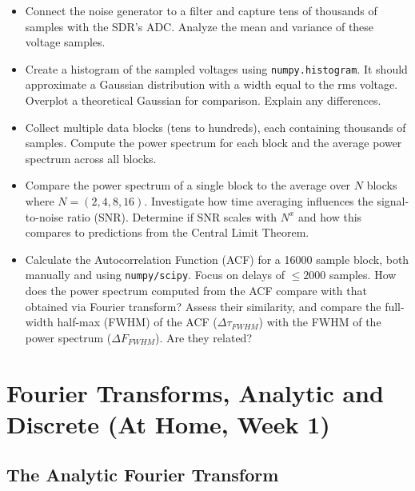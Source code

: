 \documentclass[11pt,preprint]{aastex}
\begin{document}
\begin{itemize}
    \item Connect the noise generator to a filter and capture tens of thousands of samples with the SDR's ADC. Analyze the mean and variance of these voltage samples.
    \item Create a histogram of the sampled voltages using {\tt numpy.histogram}. It should approximate a Gaussian distribution with a width equal to the rms voltage. Overplot a theoretical Gaussian for comparison. Explain any differences.
    \item Collect multiple data blocks (tens to hundreds), each containing thousands of samples. Compute the power spectrum for each block and the average power spectrum across all blocks.
    \item Compare the power spectrum of a single block to the average over $N$ blocks where $N=(2, 4, 8, 16)$. Investigate how time averaging influences the signal-to-noise ratio (SNR). Determine if SNR scales with $N^x$ and how this compares to predictions from the Central Limit Theorem.
    \item Calculate the Autocorrelation Function (ACF) for a 16000 sample block, both manually and using {\tt numpy/scipy}. Focus on delays of $\le 2000$ samples. How does the power spectrum computed from the ACF compare with that obtained via Fourier transform? Assess their similarity, and compare the full-width half-max (FWHM) of the ACF ($\Delta \tau_{FWHM}$) with the FWHM of the power spectrum ($\Delta F_{FWHM}$). Are they related?
\end{itemize}


\section{Fourier Transforms, Analytic and Discrete (At Home, Week 1)} 
\label{pwrspectrum}
 
\subsection{The Analytic Fourier Transform}
\end{document}
